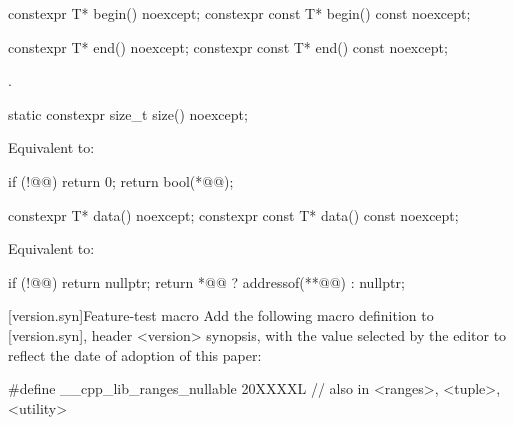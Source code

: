 \documentclass[a4paper,10pt,oneside,openany,final,article]{memoir}
\begin{document}
\begin{wording}
\begin{itemdecl}
  constexpr T* begin() noexcept;
  constexpr const T* begin() const noexcept;
\end{itemdecl}

\begin{itemdescr}
  \pnum
  \returns
\end{itemdescr}

\begin{itemdecl}
  constexpr T* end() noexcept;
  constexpr const T* end() const noexcept;
\end{itemdecl}

\begin{itemdescr}
  \pnum{}
  \returns
  .
\end{itemdescr}

\begin{itemdecl}
  static constexpr size_t size() noexcept;
\end{itemdecl}

\begin{itemdescr}
  \pnum{}
  \effects{}
  Equivalent to:

  \begin{codeblock}
    if (!@@)
      return 0;
    return bool(*@@);
  \end{codeblock}
\end{itemdescr}

\begin{itemdecl}
  constexpr T* data() noexcept;
  constexpr const T* data() const noexcept;
\end{itemdecl}

\begin{itemdescr}
\pnum{}
\effects{}
Equivalent to:
\begin{codeblock}
  if (!@@)
    return nullptr;
  return *@@ ? addressof(**@@) : nullptr;
\end{codeblock}
\end{itemdescr}

[version.syn]{Feature-test macro}
Add the following macro definition to [version.syn], header <version> synopsis, with the value selected by the editor to reflect the date of adoption of this paper:

\begin{codeblock}
  #define __cpp_lib_ranges_nullable 20XXXXL // also in <ranges>, <tuple>, <utility>
\end{codeblock}

\end{wording}
\end{document}
